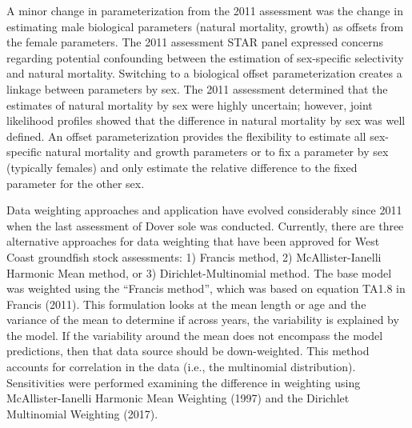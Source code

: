 \documentclass[11pt,
  english,
  a4paper,
]{article}
\begin{document}
A minor change in parameterization from the 2011 assessment was the change in estimating male biological parameters (natural mortality, growth) as offsets from the female parameters. The 2011 assessment STAR panel expressed concerns regarding potential confounding between the estimation of sex-specific selectivity and natural mortality. Switching to a biological offset parameterization creates a linkage between parameters by sex. The 2011 assessment determined that the estimates of natural mortality by sex were highly uncertain; however, joint likelihood profiles showed that the difference in natural mortality by sex was well defined. An offset parameterization provides the flexibility to estimate all sex-specific natural mortality and growth parameters or to fix a parameter by sex (typically females) and only estimate the relative difference to the fixed parameter for the other sex.

\leavevmode\tagmcend\tagstructend\par


Data weighting approaches and application have evolved considerably since 2011 when the last assessment of Dover sole was conducted. Currently, there are three alternative approaches for data weighting that have been approved for West Coast groundfish stock assessments: 1) Francis method, 2) McAllister-Ianelli Harmonic Mean method, or 3) Dirichlet-Multinomial method. The base model was weighted using the ``Francis method'', which was based on equation TA1.8 in Francis {(2011)\leavevmode\tagmcend\tagstructend}. This formulation looks at the mean length or age and the variance of the mean to determine if across years, the variability is explained by the model. If the variability around the mean does not encompass the model predictions, then that data source should be down-weighted. This method accounts for correlation in the data (i.e., the multinomial distribution). Sensitivities were performed examining the difference in weighting using McAllister-Ianelli Harmonic Mean Weighting {(1997)\leavevmode\tagmcend\tagstructend} and the Dirichlet Multinomial Weighting {(2017)\leavevmode\tagmcend\tagstructend}.

\leavevmode\tagmcend\tagstructend\par

\end{document}

